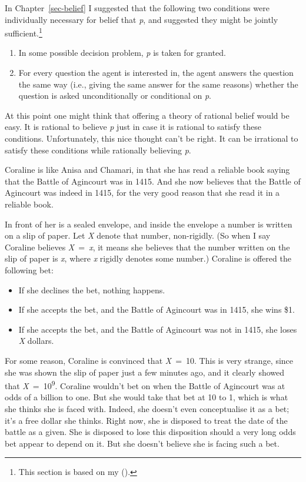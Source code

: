 \documentclass[
  10pt,
  letterpaper,
  twoside]{scrbook}
\providecommand{\tightlist}{%
  \setlength{\itemsep}{0pt}\setlength{\parskip}{0pt}}\usepackage{longtable,booktabs,array}
\begin{document}
In Chapter~\ref{sec-belief} I suggested that the following two
conditions were individually necessary for belief that \emph{p}, and
suggested they might be jointly sufficient.\footnote{This section is
  based on my ().}

\begin{enumerate}
\def\labelenumi{\arabic{enumi}.}
\tightlist
\item
  In some possible decision problem, \emph{p} is taken for granted.
\item
  For every question the agent is interested in, the agent answers the
  question the same way (i.e., giving the same answer for the same
  reasons) whether the question is asked unconditionally or conditional
  on \emph{p}.
\end{enumerate}

At this point one might think that offering a theory of rational belief
would be easy. It is rational to believe \emph{p} just in case it is
rational to satisfy these conditions. Unfortunately, this nice thought
can't be right. It can be irrational to satisfy these conditions while
rationally believing \emph{p}.

Coraline is like Anisa and Chamari, in that she has read a reliable book
saying that the Battle of Agincourt was in 1415. And she now believes
that the Battle of Agincourt was indeed in 1415, for the very good
reason that she read it in a reliable book.

In front of her is a sealed envelope, and inside the envelope a number
is written on a slip of paper. Let \emph{X} denote that number,
non-rigidly. (So when I say Coraline believes \emph{X}~=~\emph{x}, it
means she believes that the number written on the slip of paper is
\emph{x}, where \emph{x} rigidly denotes some number.) Coraline is
offered the following bet:

\begin{itemize}
\tightlist
\item
  If she declines the bet, nothing happens.
\item
  If she accepts the bet, and the Battle of Agincourt was in 1415, she
  wins \$1.
\item
  If she accepts the bet, and the Battle of Agincourt was not in 1415,
  she loses \emph{X} dollars.
\end{itemize}

For some reason, Coraline is convinced that \emph{X}~=~10. This is very
strange, since she was shown the slip of paper just a few minutes ago,
and it clearly showed that \emph{X}~=~10\textsuperscript{9}. Coraline
wouldn't bet on when the Battle of Agincourt was at odds of a billion to
one. But she would take that bet at 10 to 1, which is what she thinks
she is faced with. Indeed, she doesn't even conceptualise it as a bet;
it's a free dollar she thinks. Right now, she is disposed to treat the
date of the battle as a given. She is disposed to lose this disposition
should a very long odds bet appear to depend on it. But she doesn't
believe she is facing such a bet.
\end{document}
